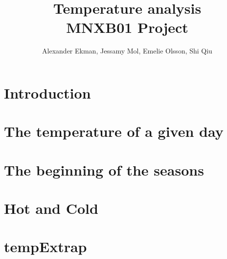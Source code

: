 \documentclass[a4paper]{article}
\title{\textbf{Temperature analysis } \\ 
\vspace{5pt}
\large MNXB01 Project}
\author{Alexander Ekman, Jessamy Mol, Emelie Olsson, Shi Qiu}
\date{ }
\begin{document}
 
 
 

\maketitle

\vspace{-24pt}
\section{Introduction}
 


\section{The temperature of a given day}


\section{The beginning of the seasons}


\section{Hot and Cold}


\section{tempExtrap}


\newpage


 
\end{document}

